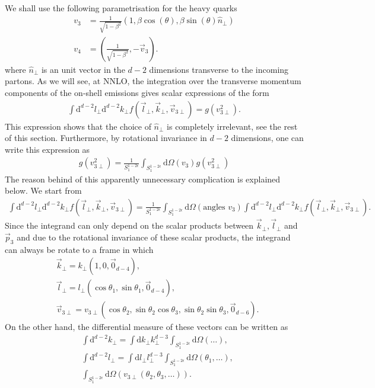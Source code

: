 \documentclass[a4paper,11pt]{article}
\numberwithin{equation}{section}
\newcommand{\dd}{\text{d}}
\newcommand{\eps}{\epsilon}
\begin{document}
We shall use the following parametrisation for the heavy quarks
%
\begin{align}
v_3&= \frac{1}{\sqrt{1-\beta^2}} \left(1, \beta\cos(\theta),
 \beta \sin{(\theta)}\hat{n}_{\perp}\right)\\
 v_4&= \left(\frac{1}{\sqrt{1-\beta^2}},- \vec{v}_3\right) .
\end{align}
%
where $\hat{n}_{\perp}$ is an unit vector in the $d-2$ dimensions transverse to
the incoming partons. As we will see, at NNLO, the integration over the
transverse momentum components of the on-shell emissions gives scalar
expressions of the form
%
\begin{align}
\int \dd^{d-2} l_\perp \dd^{d-2}k_\perp 
f(\vec{l}_\perp, \vec{k}_\perp,\vec{v}_{3\perp})
= g(v_{3\perp}^2).
\end{align}
%
This expression shows that the choice of  $\hat{n}_{\perp}$ is completely irrelevant, see the rest of this section. Furthermore, by rotational invariance in $d-2$ dimensions, one can write this expression as
%
\begin{align}
g(v_{3\perp}^2)= \frac{1}{S_1^{1-2\eps}}
\int_{S_1^{1-2\eps}} \dd\Omega(v_3)  g(v_{3\perp}^2)
\end{align}
%
The reason behind of this apparently unnecessary 
complication is explained below. We start from
%
\begin{align}
\int \dd^{d-2} l_\perp \dd^{d-2}k_\perp 
f(\vec{l}_\perp, \vec{k}_\perp,\vec{v}_{3\perp})
=  \frac{1}{S_1^{1-2\epsilon}} \int_{S_1^{1-2\eps}} \dd\Omega(\text{angles $v_3$}) 
\int \dd^{d-2} l_\perp \dd^{d-2}k_\perp 
f(\vec{l}_\perp, \vec{k}_\perp,\vec{v}_{3\perp}).
\end{align}
%
Since the integrand can only depend on the scalar products 
between $\vec{k}_\perp,\vec{l}_\perp$ and $\vec{p}_3$ and due to the
 rotational invariance of these scalar products, the integrand 
can always be rotate to a frame in which 
%
\begin{align}
&\vec{k}_\perp= k_\perp(1,0, \vec{0}_{d-4}),\\
&\vec{l}_\perp= l_\perp(\cos\theta_1,\sin\theta_1 , \vec{0}_{d-4}),\label{eq:theta1}\\
&\vec{v}_{3\perp}= v_{3\perp}(\cos\theta_2,\sin\theta_2\cos\theta_3, \sin\theta_2\sin\theta_3,\vec{0}_{d-6}).
\end{align}
On the other hand, the differential measure of these vectors can be written as 
\begin{align}
&\int \dd^{d-2} k_\perp= \int \dd k_\perp  k_\perp^{d-3} \int_{S_1^{1-2\epsilon}} \dd\Omega(\dots),\nonumber\\
&\int \dd^{d-2} l_\perp= \int \dd l_\perp  l_\perp^{d-3} \int_{S_1^{1-2\epsilon}} \dd\Omega(\theta_1,\dots), 
\label{eq:smartangles}\\
&\int_{S_1^{1-2\epsilon}} \dd\Omega( v_{3\perp} (\theta_2,\theta_3,\dots))\nonumber.
\end{align}
\end{document}

